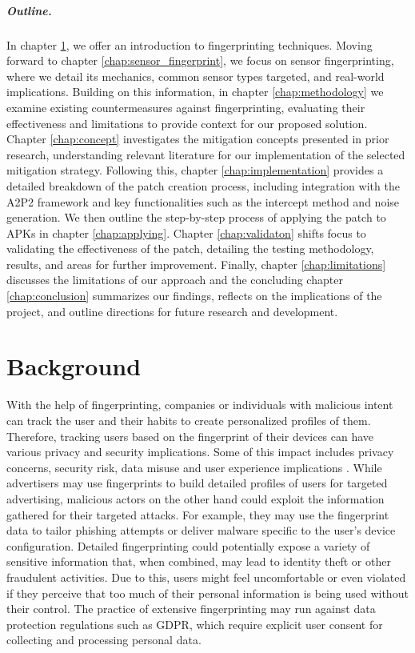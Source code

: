 \documentclass[11pt,
  oneside,openany,    %
]{scrreprt}
\begin{document}
\paragraph{Outline.}
In chapter \ref{chap:background}, we offer an introduction to fingerprinting techniques. 
Moving forward to chapter \ref{chap:sensor_fingerprint}, we focus on sensor fingerprinting, where we detail its mechanics, common sensor types targeted, and real-world implications.
Building on this information, in chapter \ref{chap:methodology} we examine existing countermeasures against fingerprinting, evaluating their effectiveness and limitations to provide context for our proposed solution. 
Chapter \ref{chap:concept} investigates the mitigation concepts presented in prior research, understanding relevant literature for our implementation of the selected mitigation strategy.
Following this, chapter \ref{chap:implementation} provides a detailed breakdown of the patch creation process, including integration with the A2P2 framework and key functionalities such as the intercept method and noise generation. 
We then outline the step-by-step process of applying the patch to APKs in chapter \ref{chap:applying}. 
Chapter \ref{chap:validaton} shifts focus to validating the effectiveness of the patch, detailing the testing methodology, results, and areas for further improvement. 
Finally, chapter \ref{chap:limitations} discusses the limitations of our approach and the concluding chapter \ref{chap:conclusion} summarizes our findings, reflects on the implications of the project, and outline directions for future research and development.


\chapter{Background}
\label{chap:background}
With the help of fingerprinting, companies or individuals with malicious intent can track the user and their habits to create personalized profiles of them.
Therefore, tracking users based on the fingerprint of their devices can have various privacy and security implications. 
Some of this impact includes privacy concerns, security risk, data misuse and user experience implications \cite{meng2023post}.
While advertisers may use fingerprints to build detailed profiles of users for targeted advertising, malicious actors on the other hand could exploit the information gathered for their targeted attacks. 
For example, they may use the fingerprint data to tailor phishing attempts or deliver malware specific to the user's device configuration.
Detailed fingerprinting could potentially expose a variety of sensitive information that, when combined, may lead to identity theft or other fraudulent activities.
Due to this, users might feel uncomfortable or even violated if they perceive that too much of their personal information is being used without their control.
The practice of extensive fingerprinting may run against data protection regulations such as GDPR, which require explicit user consent for collecting and processing personal data.
\end{document}

